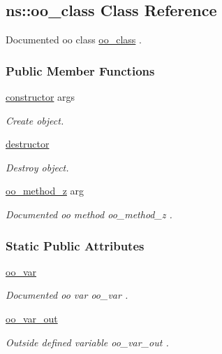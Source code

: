 \hypertarget{classns_1_1oo__class}{}\subsection{ns\+::oo\+\_\+class Class Reference}
\label{classns_1_1oo__class}


Documented oo class {\ttfamily \mbox{\hyperlink{classns_1_1oo__class}{oo\+\_\+class}}} .  


\subsubsection*{Public Member Functions}
\begin{DoxyCompactItemize}
\item 
\mbox{\hyperlink{classns_1_1oo__class_aa26b64151d4b4b0e8b4977aae7048f9b}{constructor}} args
\begin{DoxyCompactList}\small\item\em Create object. \end{DoxyCompactList}\item 
\mbox{\hyperlink{classns_1_1oo__class_af148cfc1c090a05986c68ac9452a510a}{destructor}}
\begin{DoxyCompactList}\small\item\em Destroy object. \end{DoxyCompactList}\item 
\mbox{\hyperlink{classns_1_1oo__class_a8a3cfbae3b3fca463f08adb9174a5fe8}{oo\+\_\+method\+\_\+z}} arg
\begin{DoxyCompactList}\small\item\em Documented oo method {\ttfamily oo\+\_\+method\+\_\+z} . \end{DoxyCompactList}\end{DoxyCompactItemize}
\subsubsection*{Static Public Attributes}
\begin{DoxyCompactItemize}
\item 
\mbox{\hyperlink{classns_1_1oo__class_a741f11f4a2db3876205658d4a9a279ba}{oo\+\_\+var}}
\begin{DoxyCompactList}\small\item\em Documented oo var {\ttfamily oo\+\_\+var} . \end{DoxyCompactList}\item 
\mbox{\hyperlink{classns_1_1oo__class_af46293ede16067c38ca2901416cad8ee}{oo\+\_\+var\+\_\+out}}
\begin{DoxyCompactList}\small\item\em Outside defined variable {\ttfamily oo\+\_\+var\+\_\+out} . \end{DoxyCompactList}\end{DoxyCompactItemize}
